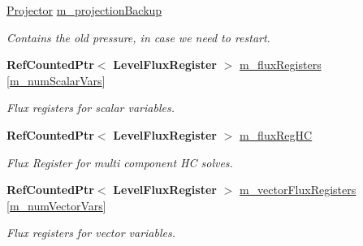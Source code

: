 \begin{DoxyCompactItemize}
\hyperlink{class_projector}{Projector} \hyperlink{class_a_m_r_level_mushy_layer_a7823bcf21f31a94608f186498d96714c}{m\+\_\+projection\+Backup}
\begin{DoxyCompactList}\small\item\em Contains the old pressure, in case we need to restart. \end{DoxyCompactList}\item 
\mbox{\label{class_a_m_r_level_mushy_layer_a415e82d9a6e78b645eef60b573aec79e}} 
\textbf{ Ref\+Counted\+Ptr}$<$ \textbf{ Level\+Flux\+Register} $>$ \hyperlink{class_a_m_r_level_mushy_layer_a415e82d9a6e78b645eef60b573aec79e}{m\+\_\+flux\+Registers} \mbox{[}\hyperlink{mushy_layer_opt_8h_afcada9fb65a998951da882b5c10191fea83db32f5839575c9d7812f3cd0727d07}{m\+\_\+num\+Scalar\+Vars}\mbox{]}
\begin{DoxyCompactList}\small\item\em Flux registers for scalar variables. \end{DoxyCompactList}\item 
\mbox{\label{class_a_m_r_level_mushy_layer_aeaa3fd2d4ab926288073064170e791f3}} 
\textbf{ Ref\+Counted\+Ptr}$<$ \textbf{ Level\+Flux\+Register} $>$ \hyperlink{class_a_m_r_level_mushy_layer_aeaa3fd2d4ab926288073064170e791f3}{m\+\_\+flux\+Reg\+HC}
\begin{DoxyCompactList}\small\item\em Flux Register for multi component HC solves. \end{DoxyCompactList}\item 
\mbox{\label{class_a_m_r_level_mushy_layer_ab6d6bc6e97ec3b0bdfe4a13de762f48c}} 
\textbf{ Ref\+Counted\+Ptr}$<$ \textbf{ Level\+Flux\+Register} $>$ \hyperlink{class_a_m_r_level_mushy_layer_ab6d6bc6e97ec3b0bdfe4a13de762f48c}{m\+\_\+vector\+Flux\+Registers} \mbox{[}\hyperlink{mushy_layer_opt_8h_ad67b5b87e24a070e739a68078dcb7520a0bc95e626dcdeae398d6bb728b28578f}{m\+\_\+num\+Vector\+Vars}\mbox{]}
\begin{DoxyCompactList}\small\item\em Flux registers for vector variables. \end{DoxyCompactList}\item 
\mbox{\label{class_a_m_r_level_mushy_layer_a7f0dd62b216d0ab459d2f8469297c852}} 

\end{DoxyCompactItemize}

